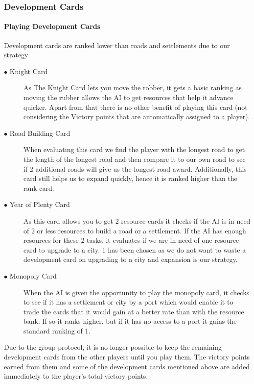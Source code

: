 \documentclass[a4paper,doc,draftfirst]{apa6}
\begin{document}
\subsubsection{Development Cards}

\paragraph{Playing Development Cards}
Development cards are ranked lower than roads and settlements due to our strategy

\begin{description}
\item[$\bullet$ Knight Card] As The Knight Card lets you move the robber, it gets a basic ranking as moving the rubber allows the AI to get resources that help it advance quicker. Apart from that there is no other benefit of playing this card (not considering the Victory points that are automatically assigned to a player).
\item[$\bullet$ Road Building Card] When evaluating this card we find the player with the longest road to get the length of the longest road and then compare it to our own road to see if 2 additional roads will give us the longest road award. Additionally, this card still helps us to expand quickly, hence it is ranked higher than the rank card.
\item[$\bullet$ Year of Plenty Card] As this card allows you to get 2 resource cards it checks if the AI is in need of 2 or less resources to build a road or a settlement. If the AI has enough resources for these 2 tasks, it evaluates if we are in need of one resource card to upgrade to a city. 1 has been chosen as we do not want to waste a development card on upgrading to a city and expansion is our strategy.
\item[$\bullet$ Monopoly Card] When the AI is given the opportunity to play the monopoly card, it checks to see if it has a settlement or city by a port which would enable it to trade the cards that it would gain at a better rate than with the resource bank. If so it ranks higher, but if it has no access to a port it gains the standard ranking of 1.
\end{description}

Due to the group protocol, it is no longer possible to keep the remaining development cards from the other players until you play them. The victory points earned from them and some of the development cards mentioned above are added immediately to the player’s total victory points.
\end{document}

